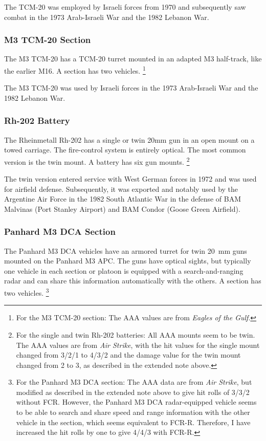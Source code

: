 \documentclass[10pt]{article}
\newcommand{\note}[1]{%
    \footnote{%
        \setlength{\parindent}{0pt}%
        \setlength{\parskip}{\smallskipamount}%
        #1
    }%
}
\begin{document}
The TCM-20 was employed by Israeli forces from 1970 and subsequently saw combat in the 1973 Arab-Israeli War and the 1982 Lebanon War.

\subsubsection{M3 TCM-20 Section}

The M3 TCM-20 has a TCM-20 turret mounted in an adapted M3 half-track, like the earlier M16. A section has two vehicles.%
\note{
    For the M3 TCM-20 section: The AAA values are from \emph{Eagles of the Gulf}.
}

The M3 TCM-20 was used by Israeli forces in the 1973 Arab-Israeli War and the 1982 Lebanon War.

\subsubsection{Rh-202 Battery}

The Rheinmetall Rh-202 has a single or twin 20mm gun in an open mount on a towed carriage. The fire-control system is entirely optical. The most common version is the twin mount. A battery has six gun mounts.%
\note{
    For the single and twin Rh-202 batteries: All AAA mounts seem to be twin. The AAA values are from \emph{Air Strike}, with the hit values for the single mount changed from 3/2/1 to 4/3/2 and the damage value for the twin mount changed from 2 to 3, as described in the extended note above.
}

The twin version entered service with West German forces in 1972 and was used for airfield defense. Subsequently, it was exported and notably used by the Argentine Air Force in the 1982 South Atlantic War in the defense of BAM Malvinas (Port Stanley Airport) and BAM Condor (Goose Green Airfield).

\subsubsection{Panhard M3 DCA Section}

The Panhard M3 DCA vehicles have an armored turret for twin 20~mm guns mounted on the Panhard M3 APC. The guns have optical sights, but typically one vehicle in each section or platoon is equipped with a search-and-ranging radar and can share this information automatically with the others. A section has two vehicles.%
\note{
    For the Panhard M3 DCA section:
    The AAA data are from \emph{Air Strike}, but modified as described in the extended note above to give hit rolls of 3/3/2 without FCR. However, the Panhard M3 DCA radar-equipped vehicle seems to be able to search and share speed and range information with the other vehicle in the section, which seems equivalent to FCR-R. Therefore, I have increased the hit rolls by one to give 4/4/3 with FCR-R.
}
\end{document}
